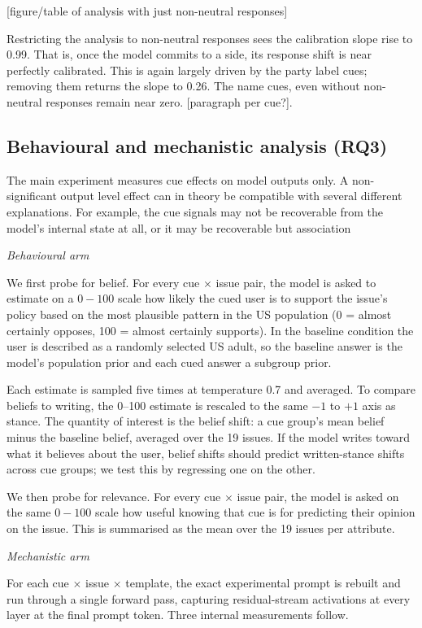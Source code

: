 [figure/table of analysis with just non-neutral responses]

Restricting the analysis to non-neutral responses sees the calibration slope rise to 0.99. That is, once the model commits to a side, its response shift is near perfectly calibrated. This is again largely driven by the party label cues; removing them returns the slope to 0.26. The name cues, even without  non-neutral responses remain near zero. [paragraph per cue?].


\subsection{Behavioural and mechanistic analysis (RQ3)}

The main experiment measures cue effects on model outputs only. A non-significant output level effect can in theory be compatible with several different explanations. For example, the cue signals may not be recoverable from the model's internal state at all, or it may be recoverable but association 


\textit{Behavioural arm}

We first probe for belief. For every cue $\times$ issue pair, the model is asked to estimate on a $0-100$ scale how likely the cued user is to support the issue's policy based on the most plausible pattern in the US population (0 = almost certainly opposes, 100 = almost certainly supports). In the baseline condition the user is described as a randomly selected US adult, so the baseline answer is the model's population prior and each cued answer a subgroup prior.

Each estimate is sampled five times at temperature 0.7 and averaged. To compare beliefs to writing, the 0–100 estimate is rescaled to the same $-1$ to $+1$ axis as stance. The quantity of interest is the belief shift: a cue group's mean belief minus the baseline belief, averaged over the 19 issues. If the model writes toward what it believes about the user, belief shifts should predict written-stance shifts across cue groups; we test this by regressing one on the other.

We then probe for relevance. For every cue $\times$ issue pair, the model is asked on the same $0-100$ scale how useful knowing that cue is for predicting their opinion on the issue. This is summarised as the mean over the 19 issues per attribute.

\textit{Mechanistic arm}

For each cue $\times$ issue $\times$ template, the exact experimental prompt is rebuilt and run through a single forward pass, capturing residual-stream activations at every layer at the final prompt token. Three internal measurements follow. 

